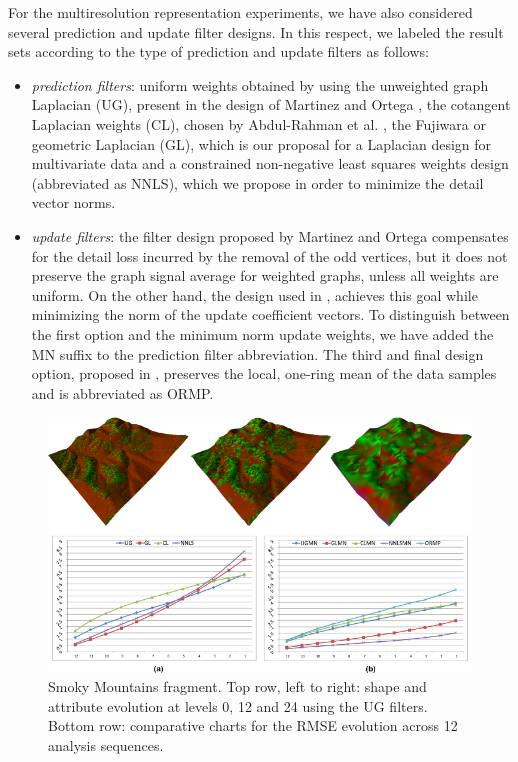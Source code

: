 \documentclass[graybox]{svmult}
\begin{document}
	
	For the multiresolution representation experiments, we have also considered several prediction and update filter designs. In this respect, we labeled the result sets according to the type of prediction and update filters as follows:
	\begin{itemize}
		\item{\emph{prediction filters}}: uniform weights obtained by using the unweighted graph Laplacian ({UG}), present in the design of Martinez and Ortega \cite{Martinez2011}, the cotangent Laplacian weights ({CL}), chosen by Abdul-Rahman et al. \cite{AbdulRahman2013}, the Fujiwara or geometric Laplacian ({GL}), which is our proposal for a Laplacian design for multivariate data and a constrained  non-negative least squares weights design (abbreviated as {NNLS}), which we propose in order to minimize the detail vector norms.
		\item{\emph{update filters}}: the filter design proposed by Martinez and Ortega \cite{Martinez2011} compensates for the detail loss incurred by the removal of the odd vertices, but it does not preserve the graph signal average for weighted graphs, unless all weights are uniform. On the other hand, the design used in \cite{Jansen2001,Wagner2005}, achieves this goal while minimizing the norm of the update coefficient vectors. To distinguish between the first option and the minimum norm update weights, we have added the {MN} suffix to the prediction filter abbreviation. The third and final design option, proposed in \cite{AbdulRahman2013}, preserves the local, one-ring mean of the data samples  and is abbreviated as {ORMP}.
	\end{itemize}
	
	\begin{figure}[!htbp]
		\centering
		\includegraphics{smokey_lod_rmse.pdf}
		
		\caption{\label{fig_cds:smokey_lod_rmse}%
			Smoky Mountains fragment. Top row, left to right: shape and attribute evolution at levels 0, 12 and 24 using the {UG} filters. Bottom row: comparative charts for the RMSE evolution across 12 analysis sequences. }
	\end{figure}
	
\end{document}
